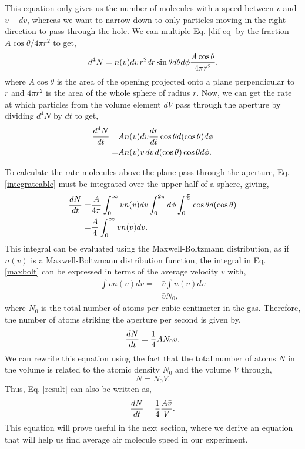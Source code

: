 \documentclass[11pt,letterpaper]{article}
\begin{document}
This equation only gives us the number of molecules with a speed between $v$ and $v + dv$, whereas we want to narrow down to only particles moving in the right direction to pass through the hole. We can multiple Eq. \eqref{dif eq} by the fraction $A \cos \theta / 4 \pi r^2$ to get,
\begin{equation}
    d^4N = n(v) dv\mkern2mu r^2 dr \sin \theta d\theta d\phi {A \cos \theta \over 4 \pi r^2} ,
\end{equation}
where $A \cos \theta$ is the area of the opening projected onto a plane perpendicular to $r$ and $4 \pi r^2$ is the area of the whole sphere of radius $r$. Now, we can get the rate at which particles from the volume element $dV$ pass through the aperture by dividing $d^4N$ by $dt$ to get,
\begin{align}
    {d^4N \over dt} = & A n(v) dv {dr \over dt} \cos \theta d(\cos \theta) d \phi \\
    = & A n(v) v\mkern2mu dv\mkern2mu d(\cos \theta) \cos \theta d \phi . \label{integrateable}
\end{align}

To calculate the rate molecules above the plane pass through the aperture, Eq. \eqref{integrateable} must be integrated over the upper half of a sphere, giving,
\begin{align}
    {dN \over dt} = & {A \over 4\pi} \int_0^\infty vn(v) dv \int_0^{2\pi} d\phi \int_0^{{\pi \over 2}} \cos \theta d(\cos \theta) \\
    = & {A \over 4} \int_0^\infty v n(v) dv . \label{maxbolt}
\end{align}
This integral can be evaluated using the Maxwell-Boltzmann distribution, as if $n(v)$ is a Maxwell-Boltzmann distribution function, the integral in Eq. \eqref{maxbolt} can be expressed in terms of the average velocity $\bar{v}$ with,
\begin{align}
    \int v n(v) dv = & \bar{v} \int n(v) dv \\
    = & \bar{v} N_0 ,
\end{align}
where $N_0$ is the total number of atoms per cubic centimeter in the gas. Therefore, the number of atoms striking the aperture per second is given by,
\begin{equation}
    {dN \over dt} = {1 \over 4} A N_0 \bar{v} . \label{result}
\end{equation}
We can rewrite this equation using the fact that the total number of atoms $N$ in the volume is related to the atomic density $N_0$ and the volume $V$ through,
\begin{equation}
    N = N_0 V .
\end{equation}
Thus, Eq. \eqref{result} can also be written as,
\begin{equation}
    {dN \over dt} = {1 \over 4} {A \bar{v} \over V} . \label{plug in able}
\end{equation}
This equation will prove useful in the next section, where we derive an equation that will help us find average air molecule speed in our experiment.
\end{document}
